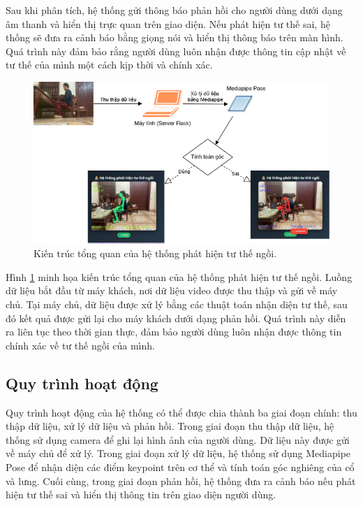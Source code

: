 \documentclass[conference]{IEEEtran}
\begin{document}
Sau khi phân tích, hệ thống gửi thông báo phản hồi cho người dùng dưới dạng âm thanh và hiển thị trực quan trên giao diện. Nếu phát hiện tư thế sai, hệ thống sẽ đưa ra cảnh báo bằng giọng nói và hiển thị thông báo trên màn hình. Quá trình này đảm bảo rằng người dùng luôn nhận được thông tin cập nhật về tư thế của mình một cách kịp thời và chính xác.
\begin{figure}[H]
    \centering
    \includegraphics[width=0.9\linewidth]{images/system_architecture.png}
    \caption{Kiến trúc tổng quan của hệ thống phát hiện tư thế ngồi.}
    \label{fig:system_architecture}
\end{figure}

Hình \ref{fig:system_architecture} minh họa kiến trúc tổng quan của hệ thống phát hiện tư thế ngồi. Luồng dữ liệu bắt đầu từ máy khách, nơi dữ liệu video được thu thập và gửi về máy chủ. Tại máy chủ, dữ liệu được xử lý bằng các thuật toán nhận diện tư thế, sau đó kết quả được gửi lại cho máy khách dưới dạng phản hồi. Quá trình này diễn ra liên tục theo thời gian thực, đảm bảo người dùng luôn nhận được thông tin chính xác về tư thế ngồi của mình.

\subsection{Quy trình hoạt động}
Quy trình hoạt động của hệ thống có thể được chia thành ba giai đoạn chính: thu thập dữ liệu, xử lý dữ liệu và phản hồi. Trong giai đoạn thu thập dữ liệu, hệ thống sử dụng camera để ghi lại hình ảnh của người dùng. Dữ liệu này được gửi về máy chủ để xử lý. Trong giai đoạn xử lý dữ liệu, hệ thống sử dụng Mediapipe Pose để nhận diện các điểm keypoint trên cơ thể và tính toán góc nghiêng của cổ và lưng. Cuối cùng, trong giai đoạn phản hồi, hệ thống đưa ra cảnh báo nếu phát hiện tư thế sai và hiển thị thông tin trên giao diện người dùng.
\end{document}
